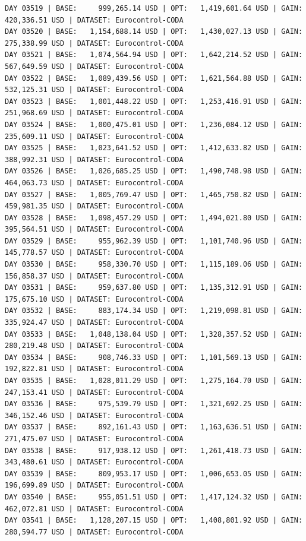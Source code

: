 \documentclass[11pt,a4paper]{article}
\begin{document}
\begin{verbatim}
DAY 03519 | BASE:     999,265.14 USD | OPT:   1,419,601.64 USD | GAIN: 420,336.51 USD | DATASET: Eurocontrol-CODA
DAY 03520 | BASE:   1,154,688.14 USD | OPT:   1,430,027.13 USD | GAIN: 275,338.99 USD | DATASET: Eurocontrol-CODA
DAY 03521 | BASE:   1,074,564.94 USD | OPT:   1,642,214.52 USD | GAIN: 567,649.59 USD | DATASET: Eurocontrol-CODA
DAY 03522 | BASE:   1,089,439.56 USD | OPT:   1,621,564.88 USD | GAIN: 532,125.31 USD | DATASET: Eurocontrol-CODA
DAY 03523 | BASE:   1,001,448.22 USD | OPT:   1,253,416.91 USD | GAIN: 251,968.69 USD | DATASET: Eurocontrol-CODA
DAY 03524 | BASE:   1,000,475.01 USD | OPT:   1,236,084.12 USD | GAIN: 235,609.11 USD | DATASET: Eurocontrol-CODA
DAY 03525 | BASE:   1,023,641.52 USD | OPT:   1,412,633.82 USD | GAIN: 388,992.31 USD | DATASET: Eurocontrol-CODA
DAY 03526 | BASE:   1,026,685.25 USD | OPT:   1,490,748.98 USD | GAIN: 464,063.73 USD | DATASET: Eurocontrol-CODA
DAY 03527 | BASE:   1,005,769.47 USD | OPT:   1,465,750.82 USD | GAIN: 459,981.35 USD | DATASET: Eurocontrol-CODA
DAY 03528 | BASE:   1,098,457.29 USD | OPT:   1,494,021.80 USD | GAIN: 395,564.51 USD | DATASET: Eurocontrol-CODA
DAY 03529 | BASE:     955,962.39 USD | OPT:   1,101,740.96 USD | GAIN: 145,778.57 USD | DATASET: Eurocontrol-CODA
DAY 03530 | BASE:     958,330.70 USD | OPT:   1,115,189.06 USD | GAIN: 156,858.37 USD | DATASET: Eurocontrol-CODA
DAY 03531 | BASE:     959,637.80 USD | OPT:   1,135,312.91 USD | GAIN: 175,675.10 USD | DATASET: Eurocontrol-CODA
DAY 03532 | BASE:     883,174.34 USD | OPT:   1,219,098.81 USD | GAIN: 335,924.47 USD | DATASET: Eurocontrol-CODA
DAY 03533 | BASE:   1,048,138.04 USD | OPT:   1,328,357.52 USD | GAIN: 280,219.48 USD | DATASET: Eurocontrol-CODA
DAY 03534 | BASE:     908,746.33 USD | OPT:   1,101,569.13 USD | GAIN: 192,822.81 USD | DATASET: Eurocontrol-CODA
DAY 03535 | BASE:   1,028,011.29 USD | OPT:   1,275,164.70 USD | GAIN: 247,153.41 USD | DATASET: Eurocontrol-CODA
DAY 03536 | BASE:     975,539.79 USD | OPT:   1,321,692.25 USD | GAIN: 346,152.46 USD | DATASET: Eurocontrol-CODA
DAY 03537 | BASE:     892,161.43 USD | OPT:   1,163,636.51 USD | GAIN: 271,475.07 USD | DATASET: Eurocontrol-CODA
DAY 03538 | BASE:     917,938.12 USD | OPT:   1,261,418.73 USD | GAIN: 343,480.61 USD | DATASET: Eurocontrol-CODA
DAY 03539 | BASE:     809,953.17 USD | OPT:   1,006,653.05 USD | GAIN: 196,699.89 USD | DATASET: Eurocontrol-CODA
DAY 03540 | BASE:     955,051.51 USD | OPT:   1,417,124.32 USD | GAIN: 462,072.81 USD | DATASET: Eurocontrol-CODA
DAY 03541 | BASE:   1,128,207.15 USD | OPT:   1,408,801.92 USD | GAIN: 280,594.77 USD | DATASET: Eurocontrol-CODA

\end{verbatim}
\end{document}
